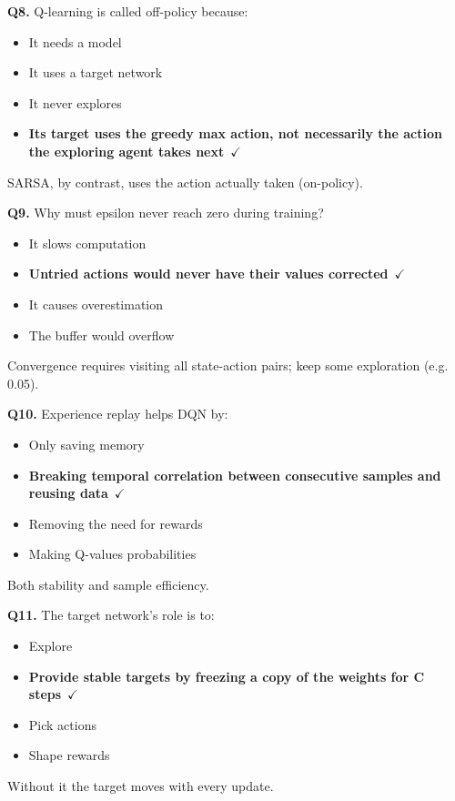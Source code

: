 \documentclass[11pt]{article}
\begin{document}
{\noindent\textbf{Q8.} Q-learning is called off-policy because:\begin{itemize}[leftmargin=2.2em,itemsep=0pt,topsep=1pt]\item[A.] It needs a model\item[B.] It uses a target network\item[C.] It never explores\item[\textbf{D.}] \textbf{Its target uses the greedy max action, not necessarily the action the exploring agent takes next}~{\color{GrnN}$\checkmark$}\end{itemize} SARSA, by contrast, uses the action actually taken (on-policy).\par\medskip

\noindent\textbf{Q9.} Why must epsilon never reach zero during training?\begin{itemize}[leftmargin=2.2em,itemsep=0pt,topsep=1pt]\item[A.] It slows computation\item[\textbf{B.}] \textbf{Untried actions would never have their values corrected}~{\color{GrnN}$\checkmark$}\item[C.] It causes overestimation\item[D.] The buffer would overflow\end{itemize} Convergence requires visiting all state-action pairs; keep some exploration (e.g. 0.05).\par\medskip

\noindent\textbf{Q10.} Experience replay helps DQN by:\begin{itemize}[leftmargin=2.2em,itemsep=0pt,topsep=1pt]\item[A.] Only saving memory\item[\textbf{B.}] \textbf{Breaking temporal correlation between consecutive samples and reusing data}~{\color{GrnN}$\checkmark$}\item[C.] Removing the need for rewards\item[D.] Making Q-values probabilities\end{itemize} Both stability and sample efficiency.\par\medskip

\noindent\textbf{Q11.} The target network's role is to:\begin{itemize}[leftmargin=2.2em,itemsep=0pt,topsep=1pt]\item[A.] Explore\item[\textbf{B.}] \textbf{Provide stable targets by freezing a copy of the weights for C steps}~{\color{GrnN}$\checkmark$}\item[C.] Pick actions\item[D.] Shape rewards\end{itemize} Without it the target moves with every update.\par\medskip

}
\end{document}
